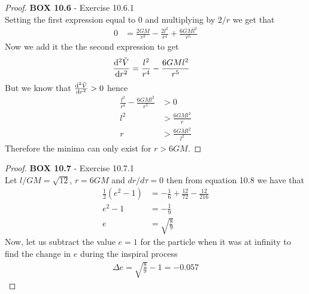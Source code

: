 \documentclass[11pt]{article}
\theoremstyle{definition}
\begin{document}
\begin{proof}{\textbf{BOX 10.6} - Exercise 10.6.1}\\
    Setting the first expression equal to 0 and multiplying by $2/r$ we get
    that
    \begin{align*}
        0 &= \frac{2GM}{r^3} - \frac{2l^2}{r^4} + \frac{6GMl^2}{r^5}
    \end{align*}
    Now we add it the the second expression to get
    \begin{align*}
        \dv[2]{\tilde{V}}{r}
        &= \frac{l^2}{r^4} - \frac{6GMl^2}{r^5}
    \end{align*}
    But we know that $\dv[2]{\tilde{V}}{r} > 0$ hence
    \begin{align*}
        \frac{l^2}{r^4} - \frac{6GMl^2}{r^5} &> 0\\
        l^2 &> \frac{6GMl^2}{r}\\
        r &>\frac{6GMl^2}{l^2}
    \end{align*}
    Therefore the minima can only exist for $r > 6GM$.
\end{proof}
\cleardoublepage
\begin{proof}{\textbf{BOX 10.7} - Exercise 10.7.1}\\
    Let $l/GM = \sqrt{12}$, $r = 6GM$ and $dr/d\tau = 0$ then from equation 
    10.8 we have that
    \begin{align*}
        \frac{1}{2}(e^2 - 1) &= -\frac{1}{6} + \frac{12}{72} - \frac{12}{216}\\
        e^2 - 1 &= - \frac{1}{9}\\
        e &= \sqrt{\frac{8}{9}}
    \end{align*}
    Now, let us subtract the value $e=1$ for the particle when it was at
    infinity to find the change in $e$ during the inspiral process
    \begin{align*}
        \Delta e = \sqrt{\frac{8}{9}} - 1 = -0.057
    \end{align*}
\end{proof}
\cleardoublepage
\end{document}

